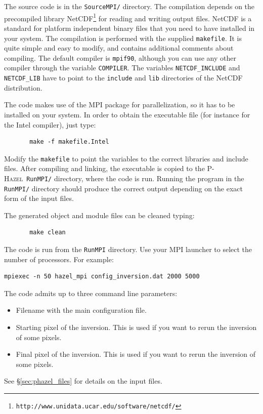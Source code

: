 \documentclass[12pt]{article}
\def\HM{\textsc{P-Hazel}}
\begin{document}
The source code is in the \texttt{SourceMPI/} directory. The compilation depends
on the precompiled library NetCDF\footnote{\texttt{http://www.unidata.ucar.edu/software/netcdf/}}
for reading and writing output files. NetCDF is a standard for platform independent
binary files that you need to have installed in your system. The compilation is performed
with the supplied \texttt{makefile}. It is quite simple and easy to modify, and
contains additional comments about compiling. The
default compiler is \texttt{mpif90}, although you can use any other
compiler through the variable \texttt{COMPILER}.
The variables \texttt{NETCDF\_INCLUDE} and \texttt{NETCDF\_LIB} have to point to the
\texttt{include} and \texttt{lib} directories of the NetCDF distribution.

The code makes use of the MPI package for parallelization, so it has
to be installed on your system. 
In order to obtain the executable file (for instance for the Intel compiler), just type:
\begin{verbatim}
       make -f makefile.Intel
\end{verbatim}
Modify the \texttt{makefile} to point the variables to the correct libraries and include
files.
After compiling and linking, the executable is copied to the \HM\ \texttt{RunMPI/} 
directory, where the code is run. Running the
program in the \texttt{RunMPI/} directory should produce the correct output 
depending on the exact form of the input files.

The generated object and module files can be cleaned typing:
\begin{verbatim}
       make clean
\end{verbatim}

The code is run from the \texttt{RunMPI} directory. Use your MPI launcher to select
the number of processors. For example:
\begin{verbatim}
mpiexec -n 50 hazel_mpi config_inversion.dat 2000 5000
\end{verbatim}
The code admits up to three command line parameters:
\begin{itemize}
\item Filename with the main configuration file.
\item Starting pixel of the inversion. This is used if you want to rerun the inversion of
some pixels.
\item Final pixel of the inversion. This is used if you want to rerun the inversion of
some pixels.
\end{itemize}
See \S\ref{sec:phazel_files} for details on the input files.
\end{document}
